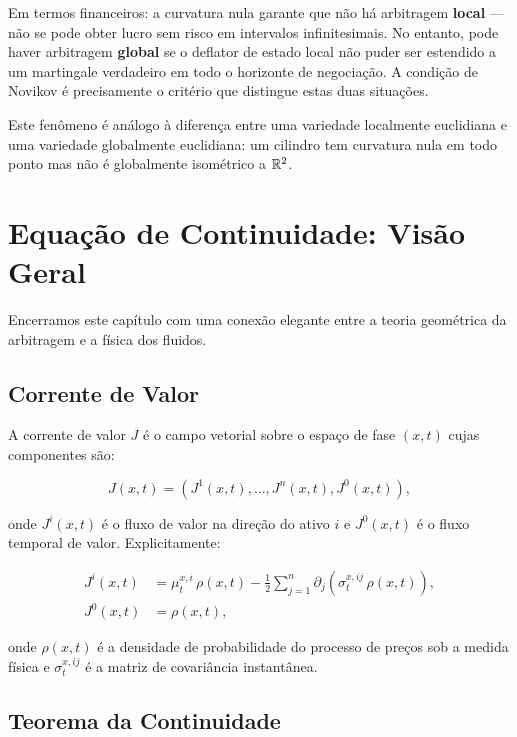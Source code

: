 \noindent Em termos financeiros: a curvatura nula garante que n\~ao h\'a arbitragem \textbf{local} --- n\~ao se pode obter lucro sem risco em intervalos infinitesimais. No entanto, pode haver arbitragem \textbf{global} se o deflator de estado local n\~ao puder ser estendido a um martingale verdadeiro em todo o horizonte de negocia\c{c}\~ao. A condi\c{c}\~ao de Novikov \'e precisamente o crit\'erio que distingue estas duas situa\c{c}\~oes.

Este fen\^omeno \'e an\'alogo \`a diferen\c{c}a entre uma variedade localmente euclidiana e uma variedade globalmente euclidiana: um cilindro tem curvatura nula em todo ponto mas n\~ao \'e globalmente isom\'etrico a $\mathbb{R}^2$.

\section{Equa\c{c}\~ao de Continuidade: Vis\~ao Geral}

Encerramos este cap\'itulo com uma conex\~ao elegante entre a teoria geom\'etrica da arbitragem e a f\'isica dos fluidos.

\subsection{Corrente de Valor}

\begin{defi}
A corrente de valor $J$ \'e o campo vetorial sobre o espa\c{c}o de fase $(x, t)$ cujas componentes s\~ao:

\begin{equation}
J(x, t) = \left(J^1(x,t), \dots, J^n(x,t), J^0(x,t)\right),
\end{equation}

onde $J^i(x,t)$ \'e o fluxo de valor na dire\c{c}\~ao do ativo $i$ e $J^0(x,t)$ \'e o fluxo temporal de valor. Explicitamente:

\begin{align}
J^i(x, t) &= \mu_t^{x,i}\, \rho(x,t) - \frac{1}{2}\sum_{j=1}^n \partial_j\left(\sigma_t^{x,ij}\,\rho(x,t)\right), \\
J^0(x, t) &= \rho(x,t),
\end{align}

onde $\rho(x,t)$ \'e a densidade de probabilidade do processo de pre\c{c}os sob a medida f\'isica e $\sigma_t^{x,ij}$ \'e a matriz de covari\^ancia instant\^anea.
\end{defi}

\subsection{Teorema da Continuidade}

